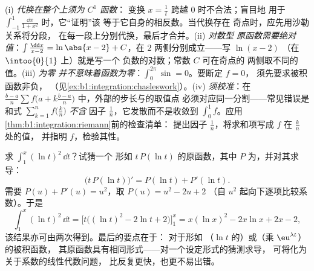 \begin{remark}[积分计算中的常见误区]
(i) \emph{代换在整个上须为 $C^1$ 函数}：
变换 $x = \frac1t$ 跨越 $0$ 时不合法；盲目地
用于 $\int_{-1}^{1}\frac{\dd x}{1 + x^2}$ 时，它“证明”该
等于它自身的相反数。当代换存在
奇点时，应先用沙勒关系将分段，
在每一段上分别代换，最后才合并。(ii) \emph{对数型
原函数需要绝对值}：$\int \frac{\dd x}{x - 2} =
\ln\abs{x - 2} + C$，在 $2$ 两侧分别成立——写 $\ln(x - 2)$
（在 $\intoo{0}{1}$ 上）就是写一个
负数的对数；常数 $C$ 可在奇点的
两侧取不同的值。(iii) \emph{为零
并不意味着函数为零}：$\int_0^{2\pi}\sin = 0$。要断定 $f = 0$，
须先要求被积函数非负，
（见\cref{ex:b1:integration:chasleswork}）。(iv) \emph{
须校准}：在 $\frac{b-a}{n}\sum f\bigl(a +
k\frac{b-a}{n}\bigr)$ 中，外部的步长与的取值点
必须对应同一分割——常见错误是和式
$\sum_{k=1}^{n} f\bigl(\frac kn\bigr)$ \emph{不含}
因子 $\frac1n$，它发散而不是收敛到 $\int_0^1
f$。应用\cref{thm:b1:integration:riemann}前的检查清单：
提出因子 $\frac1n$，将求和项写成 $f$ 在 $\frac kn$ 处的值，
并指明 $f$，检验其性。
\end{remark}

\begin{example}[猜测、求导、调整]\label{ex:b1:integration:guessdiff}
求 $\int_1^x (\ln t)^2\,\dd t$？试猜一个
形如 $t\,P(\ln t)$ 的原函数，其中 $P$ 为，并对其求导：
\[
\bigl(t\,P(\ln t)\bigr)' = P(\ln t) + P'(\ln t) .
\]
需要 $P(u) + P'(u) = u^2$，取 $P(u) = u^2 - 2u + 2$
（自 $u^2$ 起向下逐项比较系数）。于是
\[
\int_1^x (\ln t)^2\,\dd t
= \bigl[t\bigl((\ln t)^2 - 2\ln t + 2\bigr)\bigr]_1^x
= x(\ln x)^2 - 2x\ln x + 2x - 2 ,
\]
该结果亦可由两次得到。最后的要点在于：
对于形如
（$\ln t$ 的）或（乘 $\eu^{\lambda t}$）的被积函数，
其原函数具有相同形式——对一个设定形式的猜测求导，
可将化为关于系数的线性代数问题，
比反复更快，也更不易出错。
\end{example}

